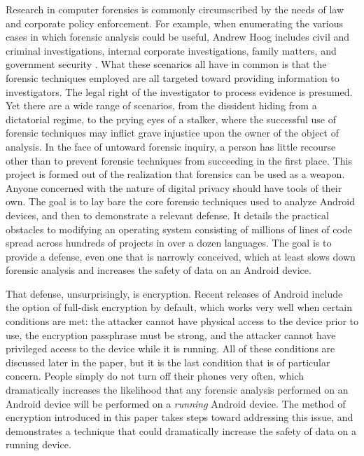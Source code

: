 Research in computer forensics is commonly circumscribed by the needs of law and corporate policy enforcement.  For example, when
enumerating the various cases in which forensic analysis could be useful, Andrew Hoog includes civil and criminal investigations,
internal corporate investigations, family matters, and government security \cite{hoog}.  What these scenarios all have in common is
that the forensic techniques employed are all targeted toward providing information to investigators.  The legal right of the
investigator to process evidence is presumed.  Yet there are a wide range of scenarios, from the dissident hiding from a dictatorial
regime, to the prying eyes of a stalker, where the successful use of forensic techniques may inflict grave injustice upon the owner
of the object of analysis.  In the face of untoward forensic inquiry, a person has little recourse other than to prevent forensic
techniques from succeeding in the first place. This project is formed out of the realization that forensics can be used as a weapon.
Anyone concerned with the nature of digital privacy should have tools of their own. The goal is to lay bare the core forensic
techniques used to analyze Android devices, and then to demonstrate a relevant defense. It details the practical obstacles to
modifying an operating system consisting of millions of lines of code spread across hundreds of projects in over a dozen languages.
The goal is to provide a defense, even one that is narrowly conceived, which at least slows down forensic analysis and increases the
safety of data on an Android device. 

That defense, unsurprisingly, is encryption. Recent releases of Android include the option of full-disk encryption by default, which
works very well when certain conditions are met: the attacker cannot have physical access to the device prior to use, the encryption
passphrase must be strong, and the attacker cannot have privileged access to the device while it is running.  All of these
conditions are discussed later in the paper, but it is the last condition that is of particular concern. People simply do not turn
off their phones very often, which dramatically increases the likelihood that any forensic analysis performed on an Android device
will be performed on a \emph{running} Android device. The method of encryption introduced in this paper takes steps toward
addressing this issue, and demonstrates a technique that could dramatically increase the safety of data on a running device.

